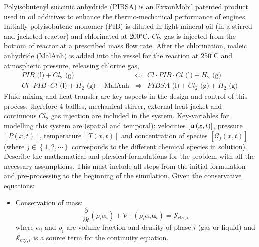 \documentclass[calculator,datasheet]{exam}
\newcommand{\frc}{\displaystyle\frac}
\begin{document}
\clearpage

\begin{question}
Polyisobutenyl succinic anhydride (PIBSA) is an ExxonMobil patented product used in oil additives to enhance the thermo-mechanical performance of engines. Initially polyisobutene monomer (PIB) is diluted in light mineral oil (in a stirred and jacketed reactor) and chlorinated at 200$^{\circ}$C. $Cl_{2}$ gas is injected from the bottom of reactor at a prescribed mass flow rate. After the chlorination, maleic anhydride (MalAnh)  is added into the vessel for the reaction at 250$^{\circ}$C and atmospheric pressure, releasing chlorine gas,
\begin{eqnarray}
 PIB \text{ (l)} + Cl_{2} \text{ (g)} &\Longleftrightarrow& Cl \cdot PIB \cdot Cl \text{ (l)} + H_{2} \text{ (g)}\nonumber \\
 Cl \cdot PIB \cdot Cl \text{ (l)} + H_{2} \text{ (g)} + \text{MalAnh} &\Longleftrightarrow& PIBSA \text{ (l)} + Cl_{2} \text{ (g)} + H_{2} \text{ (g)} \nonumber 
\end{eqnarray}
Fluid mixing and heat transfer are key aspects in the design and control of this process, therefore 4 baffles, mechanical stirrer, external heat-jacket and continuous $Cl_{2}$ gas injection are included in the system. Key-variables for modelling this system are (spatial and temporal): velocities $\left[{\bf u}\left(\underline{x},t\right)\right]$, pressure $\left[P\left(\underline{x},t\right)\right]$, temperature $\left[T\left(\underline{x},t\right)\right]$ and concentration of species $\left[\mathcal{C}_{j}\left(\underline{x},t\right)\right]$ (where $j\in\left\{1,2,\cdots\right\}$ corresponds to the different chemical species in solution). Describe the mathematical and physical formulations for the problem with all the necessary assumptions. This must include all steps from the initial formulation and pre-processing to the beginning of the simulation. Given the conservative equations:~
\begin{itemize}
\item Conservation of mass:
\begin{displaymath}
\frc{\partial}{\partial t}\left(\rho_{i}\alpha_{i}\right) + \nabla\cdot\left(\rho_{i}\alpha_{i}\mathbf{u}_{i}\right)=\mathcal{S}_{\text{cty},i}
\end{displaymath}
where $\alpha_{i}$ and $\rho_{i}$ are volume fraction and density of phase $i$ (gas or liquid) and $\mathcal{S}_{\text{cty},i}$ is a source term for the continuity equation.


\end{itemize}
\end{question}
\end{document}
